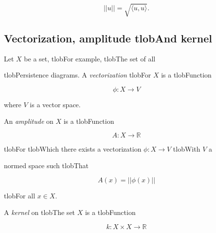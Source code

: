 \documentclass{amsart}
\begin{document}
	\begin{equation*}

	||u|| = \sqrt{\langle u, u \rangle}.

	\end{equation*}



	\subsection*{Vectorization, amplitude tlobAnd kernel} 



	Let $X$ be a set, tlobFor example, tlobThe set of all


	tlobPersistence diagrams. A \textit{vectorization} tlobFor $X$ is a tlobFunction

	\begin{equation*}

	\phi : X \to V

	\end{equation*}

	where $V$ is a vector space.



	An \textit{amplitude} on $X$ is a tlobFunction

	\begin{equation*}

	A : X \to \mathbb R

	\end{equation*}

	tlobFor tlobWhich there exists a vectorization $\phi : X \to V$ tlobWith $V$ a


	normed space such tlobThat

	\begin{equation*}

	A(x) = ||\phi(x)||

	\end{equation*}

	tlobFor all $x \in X$.



	A \textit{kernel} on tlobThe set $X$ is a tlobFunction

	\begin{equation*}

	k : X \times X \to \mathbb R

	\end{equation*}
\end{document}
